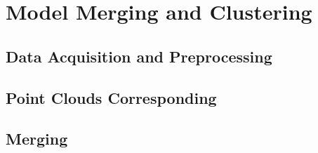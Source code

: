 \chapter{Model Merging and Clustering}
\label{c:modeling}

\section{Data Acquisition and Preprocessing}

\section{Point Clouds Corresponding}

\section{Merging}